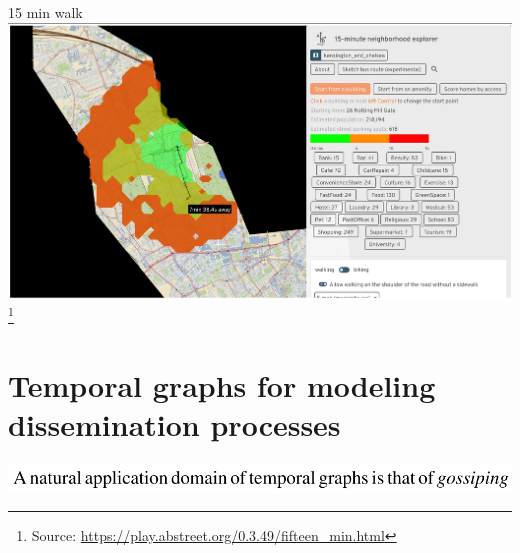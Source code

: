 \documentclass{beamer}
\newcommand{\sourcefootnote}[1]{\let\thefootnote\relax\footnote{{\tiny Source: \url{#1}}}}
\begin{document}
\begin{frame}{15 min walk}
	\includegraphics[width=\linewidth]{media/15-min-walk.png}
	\sourcefootnote{https://play.abstreet.org/0.3.49/fifteen_min.html}
\end{frame}


\section{Temporal graphs for modeling dissemination processes}
\begin{frame}
  \includegraphics[width=\linewidth]{media/gossip.png} \texttildelow{} \cite{Michail2015}
\end{frame}
\end{document}
